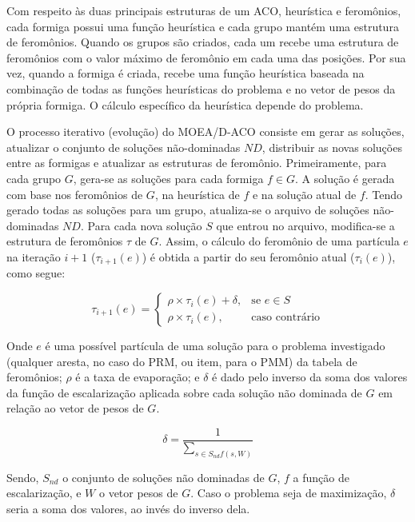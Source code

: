 Com respeito às duas principais estruturas de um ACO, heurística e feromônios, cada formiga possui uma função heurística e cada grupo mantém uma estrutura de feromônios. Quando os grupos são criados, cada um recebe uma estrutura de feromônios com o valor máximo de feromônio em cada uma das posições. Por sua vez, quando a formiga é criada, recebe uma função heurística baseada na combinação de todas as funções heurísticas do problema e no vetor de pesos da própria formiga. O cálculo específico da heurística depende do problema.

O processo iterativo (evolução) do MOEA/D-ACO consiste em gerar as soluções, atualizar o conjunto de soluções não-dominadas $ND$, distribuir as novas soluções entre as formigas e atualizar as estruturas de feromônio. Primeiramente, para cada grupo $G$, gera-se as soluções para cada formiga $f \in G$. A solução é gerada com base nos feromônios de $G$, na heurística de $f$ e na solução atual de $f$. Tendo gerado todas as soluções para um grupo, atualiza-se o arquivo de soluções não-dominadas $ND$. Para cada nova solução $S$ que entrou no arquivo, modifica-se a estrutura de feromônios $\tau$ de $G$. Assim, o cálculo do feromônio de uma partícula $e$ na iteração $i+1$ ($\tau_{i+1}(e)$) é obtida a partir do seu feromônio atual ($\tau_i(e)$), como segue:

\begin{equation}
\tau_{i+1}(e)= 
\begin{cases}
\rho \times \tau_i(e) + \delta,& \text{se } e \in S\\
\rho \times \tau_i(e),              & \text{caso contrário}
\end{cases}
\end{equation}

\vspace{4mm} %

Onde $e$ é uma possível partícula de uma solução para o problema investigado (qualquer aresta, no caso do PRM, ou item, para o PMM) da tabela de feromônios; $\rho$ é a taxa de evaporação; e $\delta$ é dado pelo inverso da soma dos valores da função de escalarização aplicada sobre cada solução não dominada de $G$ em relação ao vetor de pesos de $G$.

\begin{equation}\delta = \frac{1}{\sum_{s \in S_{nd}f(s, W)}}\end{equation}
	
Sendo, $S_{nd}$ o conjunto de soluções não dominadas de $G$, $f$ a função de escalarização, e $W$ o vetor pesos de $G$. Caso o problema seja de maximização, $\delta$ seria a soma dos valores, ao invés do inverso dela. 

